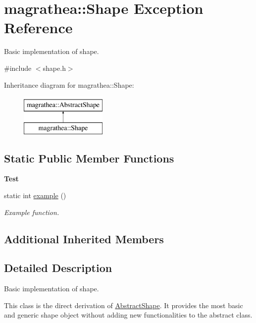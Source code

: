 \hypertarget{exceptionmagrathea_1_1Shape}{\section{magrathea\-:\-:Shape Exception Reference}
\label{exceptionmagrathea_1_1Shape}
}


Basic implementation of shape.  




{\ttfamily \#include $<$shape.\-h$>$}

Inheritance diagram for magrathea\-:\-:Shape\-:\begin{figure}[H]
\begin{center}
\leavevmode
\includegraphics[height=2.000000cm]{exceptionmagrathea_1_1Shape}
\end{center}
\end{figure}
\subsection*{Static Public Member Functions}
\begin{Indent}{\bf Test}\par
\begin{DoxyCompactItemize}
\item 
static int \hyperlink{exceptionmagrathea_1_1Shape_a1531c87c37fc6c0ea10e524a7dacb87e}{example} ()
\begin{DoxyCompactList}\small\item\em Example function. \end{DoxyCompactList}\end{DoxyCompactItemize}
\end{Indent}
\subsection*{Additional Inherited Members}


\subsection{Detailed Description}
Basic implementation of shape. 

This class is the direct derivation of \hyperlink{classmagrathea_1_1AbstractShape}{Abstract\-Shape}. It provides the most basic and generic shape object without adding new functionalities to the abstract class. 

